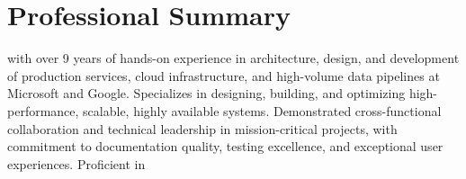 
\section{Professional Summary}
\normalsize{\POSITION{} with over 9 years of hands-on experience in architecture, design, and development of production services, cloud infrastructure, and high-volume data pipelines at Microsoft and Google. Specializes in designing, building, and optimizing high-performance, scalable, highly available systems. Demonstrated cross-functional collaboration and technical leadership in mission-critical projects, with commitment to documentation quality, testing excellence, and exceptional user experiences. Proficient in \LanguagesOrderSummary\MainTechnologies}